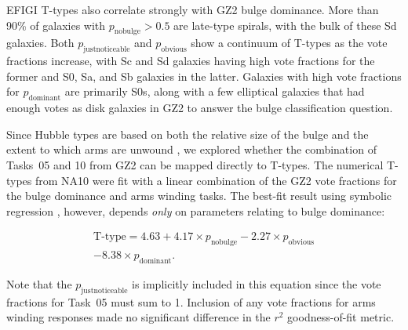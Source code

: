 \documentclass[useAMS,usenatbib]{mn2e}
\begin{document}
EFIGI T-types also correlate strongly with GZ2 bulge dominance. More than 90\% of galaxies with $p_\mathrm{no bulge}>0.5$ are late-type spirals, with the bulk of these Sd galaxies. Both $p_\mathrm{just noticeable}$ and $p_\mathrm{obvious}$ show a continuum of T-types as the vote fractions increase, with Sc and Sd galaxies having high vote fractions for the former and S0, Sa, and Sb galaxies in the latter. Galaxies with high vote fractions for $p_\mathrm{dominant}$ are primarily S0s, along with a few elliptical galaxies that had enough votes as disk galaxies in GZ2 to answer the bulge classification question. 


Since Hubble types are based on both the relative size of the bulge and the extent to which arms are unwound \citep{hub36}, we explored whether the combination of Tasks~05 and 10 from GZ2 can be mapped directly to T-types. The numerical T-types from NA10 were fit with a linear combination of the GZ2 vote fractions for the bulge dominance and arms winding tasks. The best-fit result using symbolic regression \citep{sch09c}, however, depends {\em only} on parameters relating to bulge dominance:

\begin{eqnarray}
\label{eqn-eureqa}
\text{T-type} = 4.63 + 4.17\times p_\mathrm{no bulge} - 2.27\times p_\mathrm{obvious} \\ \nonumber
- 8.38\times p_\mathrm{dominant}.
\end{eqnarray}

\noindent Note that the $p_\mathrm{just noticeable}$ is implicitly included in this equation since the vote fractions for Task~05 must sum to 1. Inclusion of any vote fractions for arms winding responses made no significant difference in the $r^2$ goodness-of-fit metric.
\end{document}
